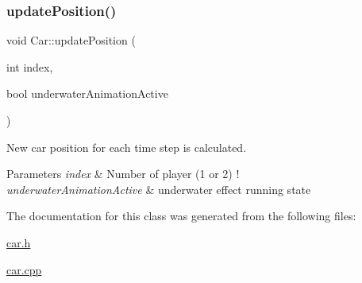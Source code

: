 \mbox{\label{class_car_a19984606f16a1f3e5cc60dd498d49e21}} 
\subsubsection{\texorpdfstring{updatePosition()}{updatePosition()}}
{\footnotesize\ttfamily void Car\+::update\+Position (\begin{DoxyParamCaption}\item[{int}]{index,  }\item[{bool}]{underwater\+Animation\+Active }\end{DoxyParamCaption})}



New car position for each time step is calculated. 


\begin{DoxyParams}{Parameters}
{\em index} & Number of player (1 or 2) !\\
\hline
{\em underwater\+Animation\+Active} & underwater effect running state \\
\hline
\end{DoxyParams}


The documentation for this class was generated from the following files\+:\begin{DoxyCompactItemize}
\item 
\mbox{\hyperlink{car_8h}{car.\+h}}\item 
\mbox{\hyperlink{car_8cpp}{car.\+cpp}}\end{DoxyCompactItemize}
